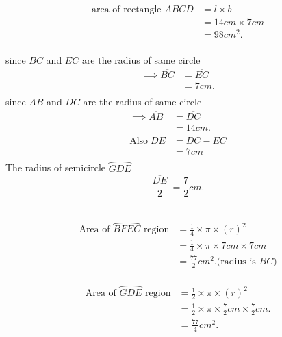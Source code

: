 \documentclass[journal,12pt,twocolumn]{IEEEtran}
\newcommand{\rectarea}[2]{#1 \times #2}
\newcommand{\semicirarea}[1]{\frac{1}{2} \times \pi \times (#1)^2}
\newcommand{\quatercirarea}[1]{\frac{1}{4} \times \pi \times (#1)^2}
\begin{document}
\begin{center}
 \begin{align*}
    \text{area of rectangle $ABCD$}&= \rectarea{l}{b} \\
                 &= \rectarea{14cm}{7cm} \\
                 &= 98cm^2.\\
  \end{align*}
\end{center}
\columnbreak

  \begin{center}
   since $BC$ and $EC$ are the radius of same circle\\
   \begin{align*}
       \implies \overline{BC} &= \overline{EC}\\
                              &= 7cm.\\
   \end{align*}
    since $AB$ and $DC$ are the radius of same circle\\
    \begin{align*}
        \implies \overline{AB} &= \overline{DC}\\
                               &= 14cm.\\
        \text{Also}\; \overline{DE} &= \overline{DC}-\overline{EC}\\
                                    &=7cm\\ 
    \end{align*}
The radius of semicircle $\wideparen{GDE}$ \\
   $$\frac{\overline{DE}}{2}\ = \frac{7}{2}cm.$$\\
    \end{center}
  
\begin{align*}
\text{Area of $\wideparen{BFEC}$ region} &= \quatercirarea{r} \\
&= \frac{1}{4} \times \pi \times 7cm \times 7cm\\ 
               &= \frac{77}{2}cm^2.\text{(radius is $BC$)}\\
\end{align*}

\begin{align*}
\text{Area of $\wideparen{GDE}$ region} &= \semicirarea{r} \\
               &=\frac{1}{2} \times \pi \times \frac{7}{2}cm \times \frac{7}{2}cm.\\
                          &= \frac{77}{4}cm^2.\\
\end{align*}
      
\end{document}
